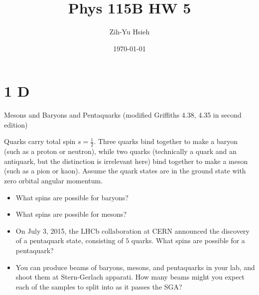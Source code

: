 \documentclass{article}
\title{Phys 115B HW 5}
\author{Zih-Yu Hsieh}
\date{\today}
\begin{document}
\maketitle

\section*{1 D}
\begin{ques}\label{q1}
Mesons and Baryons and Pentaquarks (modified Griffiths 4.38, 4.35 in second edition)

Quarks carry total spin \( s = \frac{1}{2} \). Three quarks bind together to make a baryon (such as a proton or neutron), while two quarks (technically a quark and an antiquark, but the distinction is irrelevant here) bind together to make a meson (such as a pion or kaon). Assume the quark states are in the ground state with zero orbital angular momentum.
\begin{itemize}
\item[(a)] What spins are possible for baryons?

\item[(b)] What spins are possible for mesons?

\item[(c)] On July 3, 2015, the LHCb collaboration at CERN announced the discovery of a pentaquark state, consisting of \( 5 \) quarks. What spins are possible for a pentaquark?

\item[(d)] You can produce beams of baryons, mesons, and pentaquarks in your lab, and shoot them at Stern-Gerlach apparati. How many beams might you expect each of the samples to split into as it passes the SGA?
\end{itemize}
\end{ques}
\end{document}
